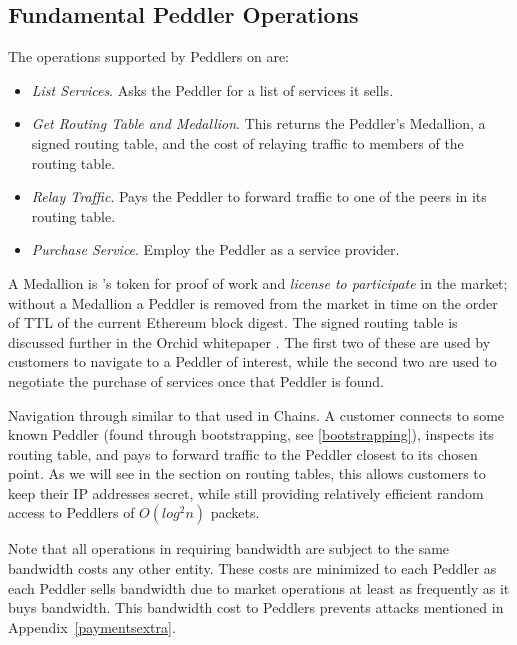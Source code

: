 \subsection{Fundamental Peddler Operations}

The operations supported by Peddlers on \tOM{} are:

\begin{itemize}
\item \emph{List Services}. Asks the Peddler for a list of services it sells.
\item \emph{Get Routing Table and Medallion}. This returns the Peddler's Medallion, a signed routing table, and the cost of relaying traffic to members of the routing table.
\item \emph{Relay Traffic}. Pays the Peddler to forward traffic to one of the peers in its routing table.
\item \emph{Purchase Service}. Employ the Peddler as a service provider.
\end{itemize}

A Medallion is \TOM{}'s token for proof of work and \textit{license to participate} in the market; without a Medallion a Peddler is removed from the market in time on the order of TTL of the current Ethereum block digest. The signed routing table 
is discussed further in the Orchid whitepaper \cite{orchid}.%
The first two of these are used by customers to navigate to a Peddler of interest, while the second two are used to negotiate the purchase of services once that Peddler is found.

{Navigation through \tOM{} similar to that used in Chains. A customer connects to some known Peddler (found through
bootstrapping, see \ref{bootstrapping}), inspects its routing table, and pays to forward traffic to the Peddler closest to its chosen point. As we will see in the section on routing tables, this allows customers to keep their IP addresses secret, while still providing relatively efficient random access to Peddlers of $O(log^2 n)$ packets.}

Note that all operations in \TOM{} requiring bandwidth are subject to the same bandwidth costs any other entity. These costs are minimized to each Peddler as each Peddler sells bandwidth due to market operations at least as frequently as it buys bandwidth. This bandwidth cost to Peddlers prevents attacks mentioned in Appendix~\ref{paymentsextra}.


